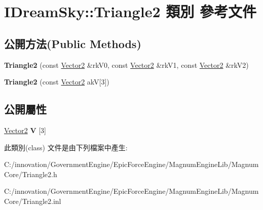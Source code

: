 \hypertarget{class_i_dream_sky_1_1_triangle2}{}\section{I\+Dream\+Sky\+:\+:Triangle2 類別 參考文件}
\label{class_i_dream_sky_1_1_triangle2}
\subsection*{公開方法(Public Methods)}
\begin{DoxyCompactItemize}
\item 
{\bfseries Triangle2} (const \hyperlink{class_i_dream_sky_1_1_vector2}{Vector2} \&rk\+V0, const \hyperlink{class_i_dream_sky_1_1_vector2}{Vector2} \&rk\+V1, const \hyperlink{class_i_dream_sky_1_1_vector2}{Vector2} \&rk\+V2)\hypertarget{class_i_dream_sky_1_1_triangle2_a4a648aacf911a6b8154a1bfe6f0f5c97}{}\label{class_i_dream_sky_1_1_triangle2_a4a648aacf911a6b8154a1bfe6f0f5c97}

\item 
{\bfseries Triangle2} (const \hyperlink{class_i_dream_sky_1_1_vector2}{Vector2} akV\mbox{[}3\mbox{]})\hypertarget{class_i_dream_sky_1_1_triangle2_a9d2f301436f48f4201833731b9652128}{}\label{class_i_dream_sky_1_1_triangle2_a9d2f301436f48f4201833731b9652128}

\end{DoxyCompactItemize}
\subsection*{公開屬性}
\begin{DoxyCompactItemize}
\item 
\hyperlink{class_i_dream_sky_1_1_vector2}{Vector2} {\bfseries V} \mbox{[}3\mbox{]}\hypertarget{class_i_dream_sky_1_1_triangle2_ad7d02280d0c74dd597da96437f8c4157}{}\label{class_i_dream_sky_1_1_triangle2_ad7d02280d0c74dd597da96437f8c4157}

\end{DoxyCompactItemize}


此類別(class) 文件是由下列檔案中產生\+:\begin{DoxyCompactItemize}
\item 
C\+:/innovation/\+Government\+Engine/\+Epic\+Force\+Engine/\+Magnum\+Engine\+Lib/\+Magnum\+Core/Triangle2.\+h\item 
C\+:/innovation/\+Government\+Engine/\+Epic\+Force\+Engine/\+Magnum\+Engine\+Lib/\+Magnum\+Core/Triangle2.\+inl\end{DoxyCompactItemize}
